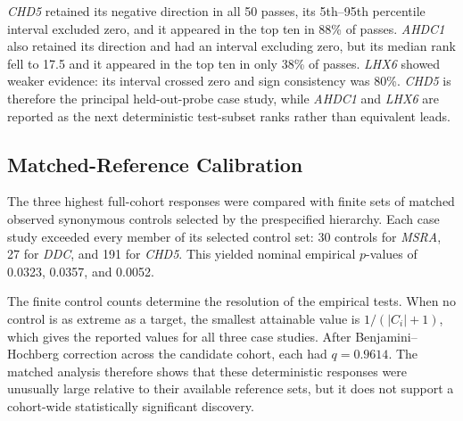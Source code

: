 \documentclass[10pt,letterpaper,twocolumn]{article}
\begin{document}
\textit{CHD5} retained its negative direction in all 50 passes, its
5th--95th percentile interval excluded zero, and it appeared in the top
ten in 88\% of passes. \textit{AHDC1} also retained its direction and
had an interval excluding zero, but its median rank fell to 17.5 and it
appeared in the top ten in only 38\% of passes. \textit{LHX6} showed
weaker evidence: its interval crossed zero and sign consistency was
80\%. \textit{CHD5} is therefore the principal held-out-probe case
study, while \textit{AHDC1} and \textit{LHX6} are reported as the next
deterministic test-subset ranks rather than equivalent leads.

\subsection{Matched-Reference Calibration}

The three highest full-cohort responses were compared with finite sets
of matched observed synonymous controls selected by the prespecified
hierarchy. Each case study exceeded every member of its selected
control set: 30 controls for \textit{MSRA}, 27 for \textit{DDC}, and
191 for \textit{CHD5}. This yielded nominal empirical $p$-values of
0.0323, 0.0357, and 0.0052.

\begin{table}[H]
\centering
\caption{\textbf{Matched calibration of the three highest-ranked
full-cohort case studies.} None remained significant after cohort-wide
Benjamini--Hochberg correction.}
\label{tab:matched-null-top3}
\small
{}
\end{table}

The finite control counts determine the resolution of the empirical
tests. When no control is as extreme as a target, the smallest
attainable value is $1/(|C_i|+1)$, which gives the reported values for
all three case studies. After Benjamini--Hochberg correction across the
candidate cohort, each had $q=0.9614$. The matched analysis therefore
shows that these deterministic responses were unusually large relative
to their available reference sets, but it does not support a
cohort-wide statistically significant discovery.
\end{document}
